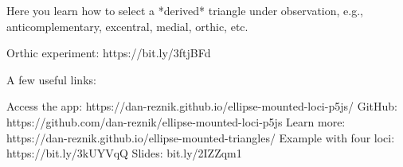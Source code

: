 Here you learn how to select a *derived* triangle under observation, e.g., anticomplementary, excentral, medial, orthic, etc.

Orthic experiment: https://bit.ly/3ftjBFd

A few useful links:

Access the app: https://dan-reznik.github.io/ellipse-mounted-loci-p5js/
GitHub: https://github.com/dan-reznik/ellipse-mounted-loci-p5js
Learn more: https://dan-reznik.github.io/ellipse-mounted-triangles/
Example with four loci: https://bit.ly/3kUYVqQ
Slides: bit.ly/2IZZqm1